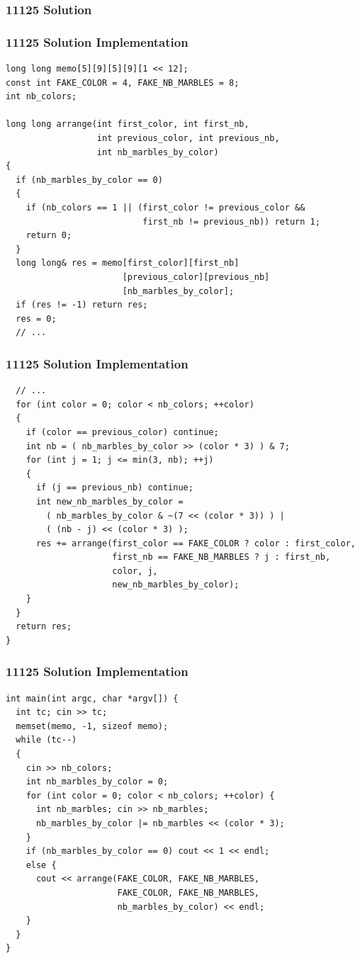 \documentclass{beamer}
\begin{document}
\ifanswers

\begin{frame}%
\frametitle{11125 Solution}

\end{frame}

\begin{frame}[fragile]
\frametitle{11125 Solution Implementation}

\scriptsize
\begin{lstlisting}
long long memo[5][9][5][9][1 << 12];
const int FAKE_COLOR = 4, FAKE_NB_MARBLES = 8;
int nb_colors;

long long arrange(int first_color, int first_nb,
                  int previous_color, int previous_nb,
                  int nb_marbles_by_color)
{
  if (nb_marbles_by_color == 0)
  {
    if (nb_colors == 1 || (first_color != previous_color &&
                           first_nb != previous_nb)) return 1;
    return 0;
  }
  long long& res = memo[first_color][first_nb]
                       [previous_color][previous_nb]
                       [nb_marbles_by_color];
  if (res != -1) return res;
  res = 0;
  // ...
\end{lstlisting}

\end{frame}

\begin{frame}[fragile]
\frametitle{11125 Solution Implementation}

\scriptsize
\begin{lstlisting}
  // ...
  for (int color = 0; color < nb_colors; ++color)
  {
    if (color == previous_color) continue;
    int nb = ( nb_marbles_by_color >> (color * 3) ) & 7;
    for (int j = 1; j <= min(3, nb); ++j)
    {
      if (j == previous_nb) continue;
      int new_nb_marbles_by_color =
        ( nb_marbles_by_color & ~(7 << (color * 3)) ) |
        ( (nb - j) << (color * 3) );
      res += arrange(first_color == FAKE_COLOR ? color : first_color,
                     first_nb == FAKE_NB_MARBLES ? j : first_nb,
                     color, j,
                     new_nb_marbles_by_color);
    }
  }
  return res;
}
\end{lstlisting}

\end{frame}

\begin{frame}[fragile]
\frametitle{11125 Solution Implementation}

\scriptsize
\begin{lstlisting}
int main(int argc, char *argv[]) {
  int tc; cin >> tc;
  memset(memo, -1, sizeof memo);
  while (tc--)
  {
    cin >> nb_colors;
    int nb_marbles_by_color = 0;
    for (int color = 0; color < nb_colors; ++color) {
      int nb_marbles; cin >> nb_marbles;
      nb_marbles_by_color |= nb_marbles << (color * 3);
    }
    if (nb_marbles_by_color == 0) cout << 1 << endl;
    else {
      cout << arrange(FAKE_COLOR, FAKE_NB_MARBLES,
                      FAKE_COLOR, FAKE_NB_MARBLES,
                      nb_marbles_by_color) << endl;
    }
  }
}
\end{lstlisting}

\end{frame}
\end{document}
